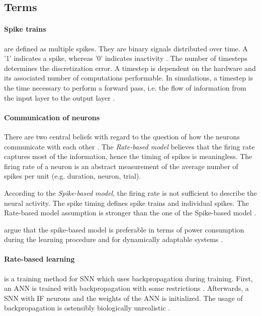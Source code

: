 \newcommand\rbModel{Rate-based model}
\newcommand\sbModel{Spike-based model}
\subsection{Terms}
\label{subsec:terms}

\paragraph{\textbf{Spike trains}}
are defined as multiple spikes.
They are binary signals distributed over time.
A '1' indicates a spike, whereas '0' indicates inactivity \cite{DIET_SNN}.
The number of timesteps determines the discretization error.
A timestep is dependent on the hardware and its associated number of computations performable.
In simulations, a timestep is the time necessary to perform a forward pass, i.e. the flow of information from the input layer to the output layer \cite{DIET_SNN}.
%
\paragraph{\textbf{Communication of neurons}}
There are two central beliefs with regard to the question of how the neurons communicate with each other \cite{spike_vs_rate}.
The \textit{\rbModel{}} believes that the firing rate captures most of the information, hence the timing of spikes is meaningless.
The firing rate of a neuron is an abstract measurement of the average number of spikes per unit (e.g. duration, neuron, trial).

According to the \textit{\sbModel{}}, the firing rate is not sufficient to describe the neural activity.
The spike timing defines spike trains and individual spikes.
The \rbModel{} assumption is stronger than the one of the \sbModel{} \cite{spike_vs_rate}.

\authorsSNN{} argue that the spike-based model is preferable in terms of power consumption 
during the learning procedure and for dynamically adaptable systems \cite{SNN}.
%
\paragraph{\textbf{Rate-based learning}} is a training method for \ac{SNN} which uses backpropagation during training. 
First, an \ac{ANN} is trained with backpropagation with some restrictions \cite{ANN_SNN_conversion,DIET_SNN}.
Afterwards, a \ac{SNN} with \ac{IF} neurons and the weights of the \ac{ANN} is initialized.
The usage of backpropagation is ostensibly biologically unrealistic \cite{STDP_like,SNN}.
